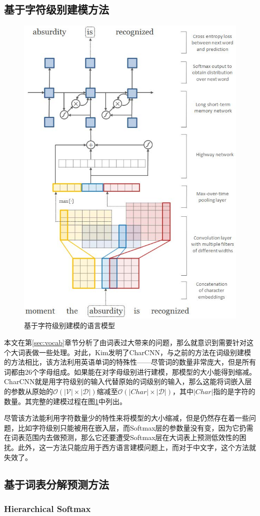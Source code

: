 \documentclass[12pt,a4paper]{article}
\begin{document}
\subsection{基于字符级别建模方法}
\begin{figure}
  \centering
  \includegraphics[width=0.4\linewidth]{./figures/CharCNN.jpg}
  \caption{基于字符级别建模的语言模型}\label{fig:charcnn}
\end{figure}
本文在第\ref{sec:vocab}章节分析了由词表过大带来的问题，那么就意识到需要针对这个大词表做一些处理。对此，Kim发明了CharCNN\cite{DBLP:conf/aaai/KimJSR16}，与之前的方法在词级别建模的方法相比，该方法利用英语单词的特殊性——尽管词的数量非常庞大，但是所有词都由26个字母组成。如果能在对字母级别进行建模，那模型的大小能得到缩减。CharCNN就是用字符级别的输入代替原始的词级别的输入，那么这能将词嵌入层的参数从原始的${\mathcal{O}(|\mathcal{V}| \times |\mathcal{D}|)}$缩减至${\mathcal{O}(|Char| \times |\mathcal{D}|)}$，其中${|Char|}$指的是字符的数量。其完整的建模过程在图\ref{fig:charcnn}中列出。

尽管该方法能利用字符数量少的特性来将模型的大小缩减，但是仍然存在着一些问题，比如字符级别只能被用在嵌入层，而Softmax层的参数量没有变，因为它扔需在词表范围内去做预测，那么它还要遭受Softmax层在大词表上预测低效性的困扰。此外，这一方法只能应用于西方语言建模问题上，而对于中文字，这个方法就失效了。

\subsection{基于词表分解预测方法}
\label{sec:vocab_facto}

\subsubsection{Hierarchical Softmax}
\label{sec:hsm}
\end{document}
